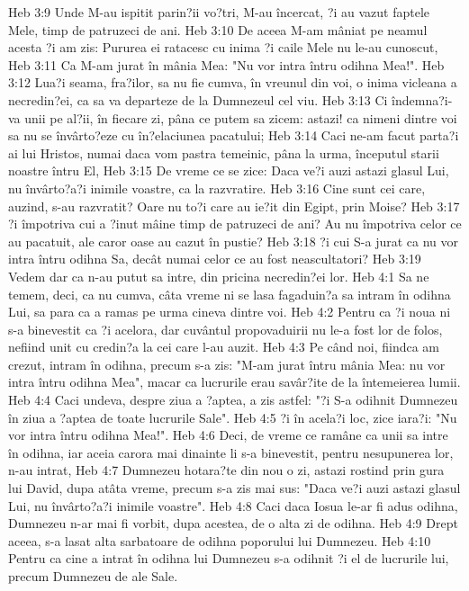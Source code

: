 Heb 3:9  Unde M-au ispitit parin?ii vo?tri, M-au încercat, ?i au vazut faptele Mele, timp de patruzeci de ani.
Heb 3:10  De aceea M-am mâniat pe neamul acesta ?i am zis: Pururea ei ratacesc cu inima ?i caile Mele nu le-au cunoscut,
Heb 3:11  Ca M-am jurat în mânia Mea: "Nu vor intra întru odihna Mea!".
Heb 3:12  Lua?i seama, fra?ilor, sa nu fie cumva, în vreunul din voi, o inima vicleana a necredin?ei, ca sa va departeze de la Dumnezeul cel viu.
Heb 3:13  Ci îndemna?i-va unii pe al?ii, în fiecare zi, pâna ce putem sa zicem: astazi! ca nimeni dintre voi sa nu se învârto?eze cu în?elaciunea pacatului;
Heb 3:14  Caci ne-am facut parta?i ai lui Hristos, numai daca vom pastra temeinic, pâna la urma, începutul starii noastre întru El,
Heb 3:15  De vreme ce se zice: Daca ve?i auzi astazi glasul Lui, nu învârto?a?i inimile voastre, ca la razvratire.
Heb 3:16  Cine sunt cei care, auzind, s-au razvratit? Oare nu to?i care au ie?it din Egipt, prin Moise?
Heb 3:17  ?i împotriva cui a ?inut mâine timp de patruzeci de ani? Au nu împotriva celor ce au pacatuit, ale caror oase au cazut în pustie?
Heb 3:18  ?i cui S-a jurat ca nu vor intra întru odihna Sa, decât numai celor ce au fost neascultatori?
Heb 3:19  Vedem dar ca n-au putut sa intre, din pricina necredin?ei lor.
Heb 4:1  Sa ne temem, deci, ca nu cumva, câta vreme ni se lasa fagaduin?a sa intram în odihna Lui, sa para ca a ramas pe urma cineva dintre voi.
Heb 4:2  Pentru ca ?i noua ni s-a binevestit ca ?i acelora, dar cuvântul propovaduirii nu le-a fost lor de folos, nefiind unit cu credin?a la cei care l-au auzit.
Heb 4:3  Pe când noi, fiindca am crezut, intram în odihna, precum s-a zis: "M-am jurat întru mânia Mea: nu vor intra întru odihna Mea", macar ca lucrurile erau savâr?ite de la întemeierea lumii.
Heb 4:4  Caci undeva, despre ziua a ?aptea, a zis astfel: "?i S-a odihnit Dumnezeu în ziua a ?aptea de toate lucrurile Sale".
Heb 4:5  ?i în acela?i loc, zice iara?i: "Nu vor intra întru odihna Mea!".
Heb 4:6  Deci, de vreme ce ramâne ca unii sa intre în odihna, iar aceia carora mai dinainte li s-a binevestit, pentru nesupunerea lor, n-au intrat,
Heb 4:7  Dumnezeu hotara?te din nou o zi, astazi rostind prin gura lui David, dupa atâta vreme, precum s-a zis mai sus: "Daca ve?i auzi astazi glasul Lui, nu învârto?a?i inimile voastre".
Heb 4:8  Caci daca Iosua le-ar fi adus odihna, Dumnezeu n-ar mai fi vorbit, dupa acestea, de o alta zi de odihna.
Heb 4:9  Drept aceea, s-a lasat alta sarbatoare de odihna poporului lui Dumnezeu.
Heb 4:10  Pentru ca cine a intrat în odihna lui Dumnezeu s-a odihnit ?i el de lucrurile lui, precum Dumnezeu de ale Sale.
